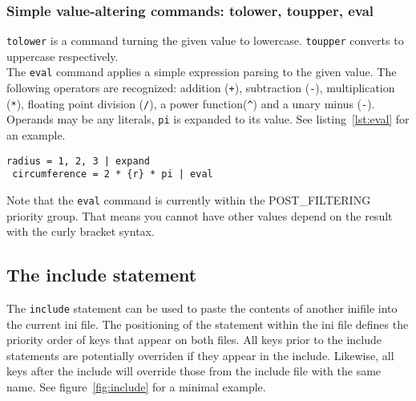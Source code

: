 \documentclass[11pt]{article}
\begin{document}
\subsubsection{Simple value-altering commands: tolower, toupper, eval}

\lstinline!tolower! is a command turning the given value to lowercase. \lstinline!toupper! converts to uppercase respectively. \\

The \lstinline!eval! command applies a simple expression parsing to the given value. The following operators are recognized: addition (\lstinline!+!), subtraction (\lstinline!-!), multiplication (\lstinline!*!), floating point division (\lstinline!/!), a power function(\lstinline!^!) and a unary minus (\lstinline!-!). Operands may be any literals, \lstinline!pi! is expanded to its value. See listing~\ref{lst:eval} for an example.

\begin{lstlisting}[caption={An example of the eval command},label=lst:eval]
 radius = 1, 2, 3 | expand
 circumference = 2 * {r} * pi | eval
\end{lstlisting}

Note that the \lstinline!eval! command is currently within the POST_FILTERING priority group. That means you cannot have other values depend on the result with the curly bracket syntax.

\subsection{The include statement}
The \lstinline!include! statement can be used to paste the contents of another inifile into the current ini file. The positioning of the statement within the ini file defines the priority order of keys that appear on both files. All keys prior to the include statements are potentially overriden if they appear in the include. Likewise, all keys after the include will override those from the include file with the same name. See figure~\ref{fig:include} for a minimal example. \\
\end{document}
